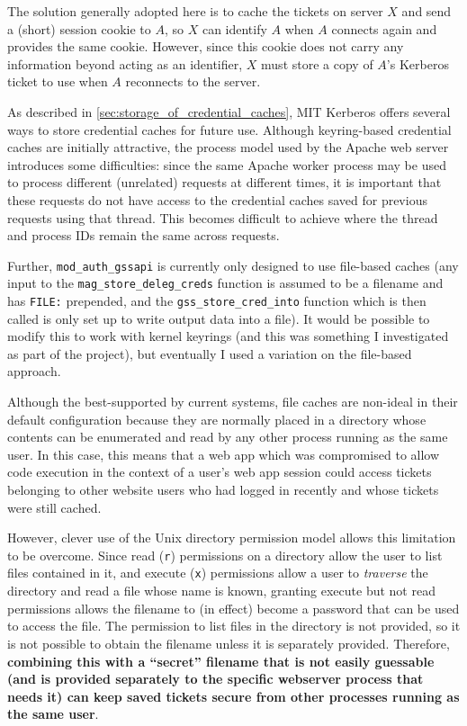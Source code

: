 \documentclass[12pt]{report}
\begin{document}
The solution generally adopted here is to cache the tickets on server $X$ and send a (short) session cookie to $A$, so $X$ can identify $A$ when $A$ connects again and provides the same cookie. However, since this cookie does not carry any information beyond acting as an identifier, $X$ must store a copy of $A$'s Kerberos ticket to use when $A$ reconnects to the server.

As described in \autoref{sec:storage_of_credential_caches}, MIT Kerberos offers several ways to store credential caches for future use. Although keyring-based credential caches are initially attractive, the process model used by the Apache web server introduces some difficulties: since the same Apache worker process may be used to process different (unrelated) requests at different times, it is important that these requests do not have access to the credential caches saved for previous requests using that thread. This becomes difficult to achieve where the thread and process IDs remain the same across requests.

Further, \verb+mod_auth_gssapi+ is currently only designed to use file-based caches (any input to the \verb+mag_store_deleg_creds+ function is assumed to be a filename and has \texttt{FILE:} prepended, and the \verb+gss_store_cred_into+ function which is then called is only set up to write output data into a file). It would be possible to modify this to work with kernel keyrings (and this was something I investigated as part of the project), but eventually I used a variation on the file-based approach.

Although the best-supported by current systems, file caches are non-ideal in their default configuration because they are normally placed in a directory whose contents can be enumerated and read by any other process running as the same user. In this case, this means that a web app which was compromised to allow code execution in the context of a user's web app session could access tickets belonging to other website users who had logged in recently and whose tickets were still cached.

However, clever use of the Unix directory permission model allows this limitation to be overcome. Since read (\texttt{r}) permissions on a directory allow the user to list files contained in it, and execute (\texttt{x}) permissions allow a user to \textit{traverse} the directory and read a file whose name is known, granting execute but not read permissions allows the filename to (in effect) become a password that can be used to access the file. The permission to list files in the directory is not provided, so it is not possible to obtain the filename unless it is separately provided. Therefore, \textbf{combining this with a ``secret'' filename that is not easily guessable (and is provided separately to the specific webserver process that needs it) can keep saved tickets secure from other processes running as the same user}.
\end{document}
